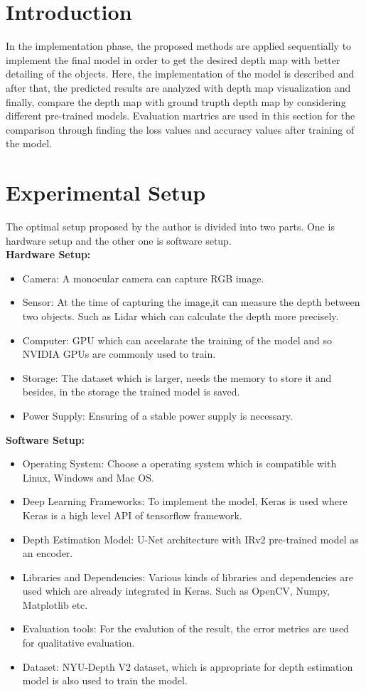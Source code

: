 \documentclass[a4paper,12pt,oneside]{book}
\begin{document}
\section{Introduction}
In the implementation phase, the proposed methods are applied sequentially to implement the final model in order to get the desired depth map with better detailing of the objects. Here, the implementation of the model is described and after that, the predicted results are analyzed with depth map visualization and finally, compare the depth map with ground trupth depth map by considering different pre-trained models. Evaluation martrics are used in this section for the comparison through finding the loss values and accuracy values after training of the model.

\section{Experimental Setup}
The optimal setup proposed by the author is divided into two parts. One is hardware setup and the other one is software setup.\\
\textbf{Hardware Setup:}
\begin{itemize}
  \item Camera: A monocular camera can capture RGB image.
  \item Sensor: At the time of capturing the image,it can measure the depth between two objects. Such as Lidar which can calculate the depth more precisely.
  \item Computer: GPU which can accelarate the training of the model and so NVIDIA GPUs are commonly used to train.
  \item Storage: The dataset which is larger, needs the memory to store it and besides, in the storage the trained model is saved.
  \item Power Supply: Ensuring of a stable power supply is necessary.
\end{itemize}
\newpage
\textbf{Software Setup:}
\begin{itemize}
  \item Operating System: Choose a operating system which is compatible with Linux, Windows and Mac OS.
  \item Deep Learning Frameworks: To implement the model, Keras is used where Keras is a high level API of tensorflow framework.
  \item Depth Estimation Model: U-Net architecture with IRv2 pre-trained model as an encoder.
  \item Libraries and Dependencies: Various kinds of libraries and dependencies are used which are already integrated in Keras. Such as OpenCV, Numpy, Matplotlib etc.
  \item Evaluation tools: For the evalution of the result, the error metrics are used for qualitative evaluation.
  \item Dataset: NYU-Depth V2 dataset, which is appropriate for depth estimation model is also used to train the model.
\end{itemize}
\end{document}
